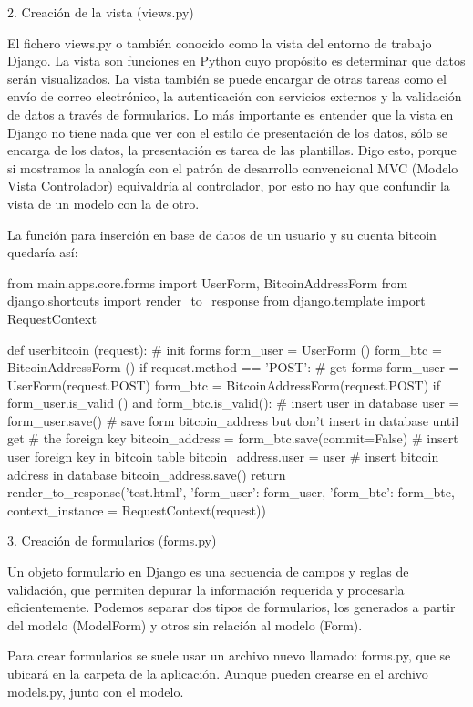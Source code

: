 \documentclass[a4paper, 12pt]{book}
\begin{document}
2. Creación de la vista (views.py)

El fichero views.py o también conocido como la vista del entorno de trabajo Django. La vista son funciones en Python cuyo propósito es determinar que datos serán visualizados. La vista también se puede encargar de otras tareas como el envío de correo electrónico, la autenticación con servicios externos y la validación de datos a través de formularios. Lo más importante es entender que la vista en Django no tiene nada que ver con el estilo de presentación de los datos, sólo se encarga de los datos, la presentación es tarea de las plantillas. Digo esto, porque si mostramos la analogía con el patrón de desarrollo convencional MVC (Modelo Vista Controlador) equivaldría al controlador, por esto no hay que confundir la vista de un modelo con la de otro.

La función para inserción en base de datos de un usuario y su cuenta bitcoin quedaría así:

from main.apps.core.forms import UserForm, BitcoinAddressForm
from django.shortcuts import render_to_response
from django.template import RequestContext
 
def userbitcoin (request):
  # init forms
  form_user = UserForm ()
  form_btc = BitcoinAddressForm ()
  if request.method == 'POST':
    # get forms
    form_user = UserForm(request.POST)
    form_btc = BitcoinAddressForm(request.POST)
    if form_user.is_valid () and form_btc.is_valid():
      # insert user in database
      user = form_user.save()
      # save form bitcoin_address but don't insert in database until get
      # the foreign key
      bitcoin_address = form_btc.save(commit=False)
      # insert user foreign key in bitcoin table
      bitcoin_address.user = user
      # insert bitcoin address in database
      bitcoin_address.save()
  return render_to_response('test.html', {'form_user': form_user,
      'form_btc': form_btc}, context_instance = RequestContext(request))

3. Creación de formularios (forms.py)

Un objeto formulario en Django es una secuencia de campos y reglas de validación, que permiten depurar la información requerida y procesarla eficientemente. Podemos separar dos tipos de formularios, los generados a partir del modelo (ModelForm) y otros sin relación al modelo (Form).

Para crear formularios se suele usar un archivo nuevo llamado: forms.py, que se ubicará en la carpeta de la aplicación. Aunque pueden crearse en el archivo models.py, junto con el modelo.
\end{document}
